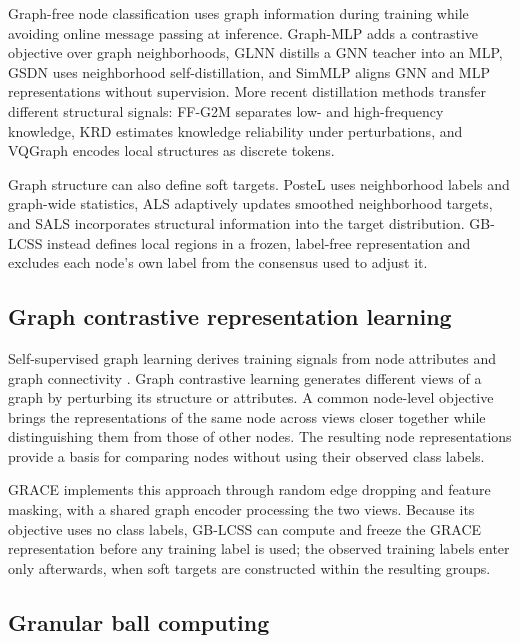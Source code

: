 \documentclass[times,review,10pt]{elsarticle}
\theoremstyle{definition}
\theoremstyle{plain}
\begin{document}
Graph-free node classification uses graph information during training while avoiding online message passing at inference. Graph-MLP \cite{ref3} adds a contrastive objective over graph neighborhoods, GLNN \cite{ref4} distills a GNN teacher into an MLP, GSDN \cite{ref40} uses neighborhood self-distillation, and SimMLP \cite{ref41} aligns GNN and MLP representations without supervision. More recent distillation methods transfer different structural signals: FF-G2M \cite{ref45} separates low- and high-frequency knowledge, KRD \cite{ref46} estimates knowledge reliability under perturbations, and VQGraph \cite{ref47} encodes local structures as discrete tokens.

Graph structure can also define soft targets. PosteL \cite{ref54} uses neighborhood labels and graph-wide statistics, ALS \cite{ref55} adaptively updates smoothed neighborhood targets, and SALS \cite{ref56} incorporates structural information into the target distribution. GB-LCSS instead defines local regions in a frozen, label-free representation and excludes each node's own label from the consensus used to adjust it.

\subsection{Graph contrastive representation learning}\label{sec:2.4}

Self-supervised graph learning derives training signals from node attributes and graph connectivity \cite{ref57}. Graph contrastive learning generates different views of a graph by perturbing its structure or attributes. A common node-level objective brings the representations of the same node across views closer together while distinguishing them from those of other nodes. The resulting node representations provide a basis for comparing nodes without using their observed class labels.

GRACE \cite{ref12} implements this approach through random edge dropping and feature masking, with a shared graph encoder processing the two views. Because its objective uses no class labels, GB-LCSS can compute and freeze the GRACE representation before any training label is used; the observed training labels enter only afterwards, when soft targets are constructed within the resulting groups.

\subsection{Granular ball computing}\label{sec:2.5}
\end{document}
